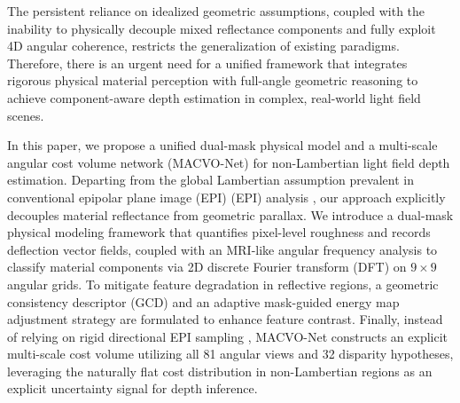 \documentclass[lettersize,journal]{IEEEtran}
\begin{document}
The persistent reliance on idealized geometric assumptions, coupled with the inability to physically decouple mixed reflectance components and fully exploit 4D angular coherence, restricts the generalization of existing paradigms. Therefore, there is an urgent need for a unified framework that integrates rigorous physical material perception with full-angle geometric reasoning to achieve component-aware depth estimation in complex, real-world light field scenes.

In this paper, we propose a unified dual-mask physical model and a multi-scale angular cost volume network (MACVO-Net) for non-Lambertian light field depth estimation. Departing from the global Lambertian assumption prevalent in conventional epipolar plane image (EPI) (EPI) analysis \cite{wanner2014, tao2013}, our approach explicitly decouples material reflectance from geometric parallax. We introduce a dual-mask physical modeling framework that quantifies pixel-level roughness and records deflection vector fields, coupled with an MRI-like angular frequency analysis to classify material components via 2D discrete Fourier transform (DFT) on $9 \times 9$ angular grids. To mitigate feature degradation in reflective regions, a geometric consistency descriptor (GCD) and an adaptive mask-guided energy map adjustment strategy are formulated to enhance feature contrast. Finally, instead of relying on rigid directional EPI sampling \cite{heber2018, lyu2022}, MACVO-Net constructs an explicit multi-scale cost volume utilizing all 81 angular views and 32 disparity hypotheses, leveraging the naturally flat cost distribution in non-Lambertian regions as an explicit uncertainty signal for depth inference.
\end{document}
